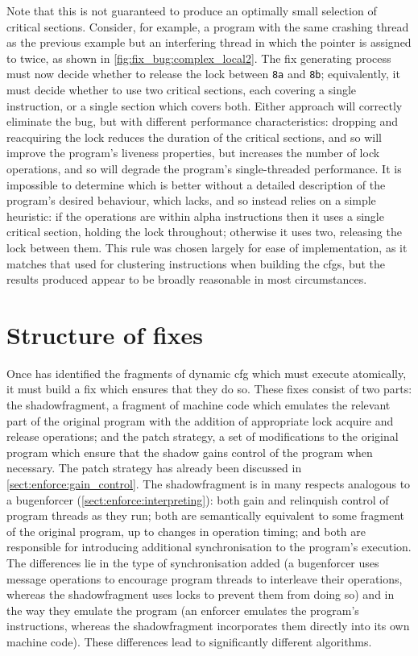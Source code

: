 Note that this is not guaranteed to produce an optimally small
selection of critical sections.  Consider, for example, a program with
the same crashing thread as the previous example but an interfering
thread in which the pointer is assigned to twice, as shown in
\autoref{fig:fix_bug:complex_local2}.  The fix generating process must
now decide whether to release the lock between \texttt{8a} and
\texttt{8b}; equivalently, it must decide whether to use two critical
sections, each covering a single instruction, or a single section
which covers both.  Either approach will correctly eliminate the bug,
but with different performance characteristics: dropping and
reacquiring the lock reduces the duration of the critical sections,
and so will improve the program's liveness properties, but increases
the number of lock operations, and so will degrade the program's
single-threaded performance.  It is impossible to determine which is
better without a detailed description of the program's desired
behaviour, which {\technique} lacks, and so {\technique} instead
relies on a simple heuristic: if the operations are within \gls{alpha}
instructions then it uses a single critical section, holding the lock
throughout; otherwise it uses two, releasing the lock between them.
This rule was chosen largely for ease of implementation, as it matches
that used for clustering instructions when building the \glspl{cfg},
but the results produced appear to be broadly reasonable in most
circumstances.

\section{Structure of fixes}

\noindent
Once {\technique} has identified the fragments of \gls{dynamic cfg}
which must execute atomically, it must build a fix which ensures that
they do so.  These fixes consist of two parts: the
\gls{shadowfragment}, a fragment of machine code which emulates the
relevant part of the original program with the addition of appropriate
lock acquire and release operations; and the patch strategy, a set of
modifications to the original program which ensure that the shadow
gains control of the program when necessary.  The patch strategy has
already been discussed in \autoref{sect:enforce:gain_control}.  The
\gls{shadowfragment} is in many respects analogous to a
\gls{bugenforcer} (\autoref{sect:enforce:interpreting}): both gain and
relinquish control of program threads as they run; both are
semantically equivalent to some fragment of the original program, up
to changes in operation timing; and both are responsible for
introducing additional synchronisation to the program's execution.
The differences lie in the type of synchronisation added (a
\gls{bugenforcer} uses message operations to encourage program threads
to interleave their operations, whereas the \gls{shadowfragment} uses
locks to prevent them from doing so) and in the way they emulate the
program (an enforcer emulates the program's instructions, whereas the
\gls{shadowfragment} incorporates them directly into its own machine
code).  These differences lead to significantly different algorithms.

